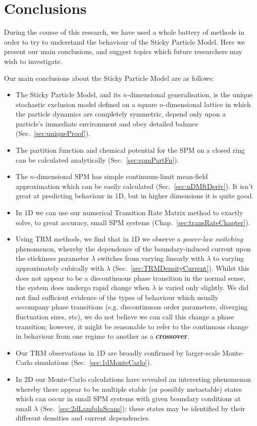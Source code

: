 \chapter{Conclusions} \label{sec:conclusionsChap}
During the course of this research, we have used a whole battery of methods in order to try to understand
the behaviour of the Sticky Particle Model. Here we present our main conclusions, and suggest topics which
future researchers may wish to investigate.

Our main conclusions about the Sticky Particle Model are as follows:
\begin{itemize}
 \item The Sticky Particle Model, and its $n$-dimensional generalisation, is the unique stochastic exclusion 
 model defined on a square $n$-dimensional lattice in which the particle dynamics are completely symmetric,
 depend only upon a particle's immediate environment and obey detailed balance (Sec.~\ref{sec:uniqueProof}).
 \item The partition function and chemical potential for the SPM on a closed ring can be calculated analytically (Sec.~\ref{sec:spmPartFn}).
 \item The $n$-dimensional SPM has simple continuum-limit mean-field approximation which can be easily
 calculated (Sec.~\ref{sec:nDMftDeriv}). It isn't great at predicting behaviour in $1$D, but in higher dimensions
 it is quite good.
 \item In $1$D we can use our numerical Transition Rate Matrix method to exactly solve, to great accuracy,
 small SPM systems (Chap.~\ref{sec:transRateChapter}).
 \item Using TRM methods, we find that in $1$D we observe a \textit{power-law switching} phenomenon, whereby the dependence of the boundary-induced current upon the stickiness parameter $\lambda$ switches from
 varying linearly with $\lambda$ to varying approximately cubically with $\lambda$ 
 (Sec.~\ref{sec:TRMDensityCurrent}). Whilst this does not appear to be a discontinuous phase transition in the
 normal sense, the system does undergo rapid change when $\lambda$ is varied only slightly. We did not find
 sufficient evidence of the types of behaviour which usually accompany phase transitions (e.g. discontinuous order
 parameters, diverging fluctuation sizes, etc), we do not believe we can call this change a phase transition;
 however, it might be reasonable to refer to the continuous change in  behaviour from one regime to another as a
 \textbf{crossover}.
 \item Our TRM observations in $1$D are broadly confirmed by larger-scale Monte-Carlo simulations 
 (Sec.~\ref{sec:1dMonteCarlo}).
 \item In $2$D our Monte-Carlo calculations have revealed an interesting phenomenon whereby there appear
 to be multiple stable (or possibly metastable) states which can occur in small SPM systems with given boundary
 conditions at small $\lambda$ (Sec.~\ref{sec:2dLambdaScans}); these states may be identified by their 
 different densities and current dependencies.
\end{itemize}

